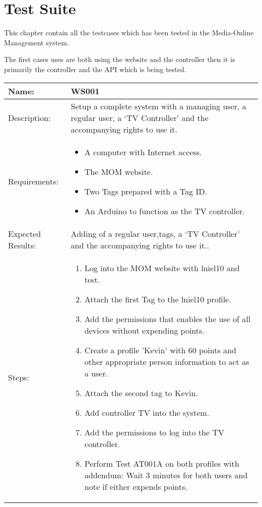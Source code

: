 \chapter{Test Suite}
\label{appen:testSuite}
This chapter contain all the testcases which has been tested in the Media-Online Management system.

The first cases uses are both using the website and the controller then it is primarily the controller and the API which is being tested.
\begin{table}[h]
	\centering
		\begin{tabular*}{\textwidth}{|l|l|}
		\hline
		\hline
		Name: & WS001\\
		\hline
		Description: & \parbox{0.70\textwidth}{Setup a complete system with a managing user, a regular user, a `TV Controller' and the accompanying rights to use it.}\\
		\hline
		Requirements: & \parbox{0.70\textwidth}{
		\begin{itemize}
			\item A computer with Internet access.
			\item The MOM website.
			\item Two Tags prepared with a Tag ID.
			\item An Arduino to function as the TV controller. 
		\end{itemize}}
		\\
		\hline
		Expected Results: & \parbox{.70\textwidth}{Adding of a regular user,tags, a `TV Controller' and the accompanying rights to use it..}\\
		\hline
		Steps: & \parbox{.70\textwidth}{
		\begin{enumerate}
			\item Log into the MOM website with lniel10 and test.
			\item Attach the first Tag to the lniel10 profile.
			\item Add the permissions that enables the use of all devices without expending points.
			\item Create a profile 'Kevin' with 60 points and other appropriate person information to act as a user.
			\item Attach the second tag to Kevin.
			\item Add controller TV into the system.
			\item Add the permissions to log into the TV controller.
			\item Perform Test AT001A on both profiles with addendum: Wait 3 minutes for both users and note if either expends points.

\end{enumerate}}
\end{tabular*}
\end{table}
